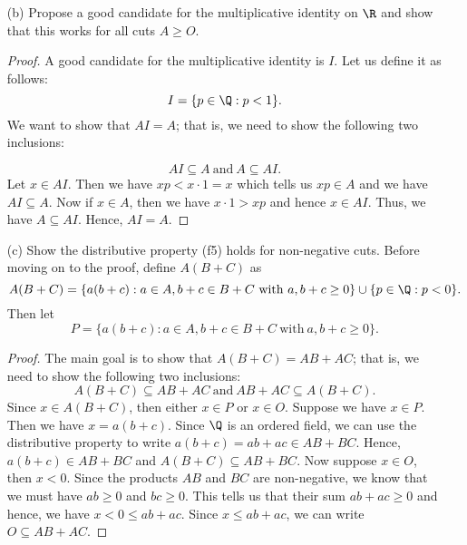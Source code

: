\begin{enumerate}
\begin{proof}
    Now we need to show that  property \( (o5)   \) holds for \( AB \). Assume \( A \geq O  \) and \( B \geq O  \). We know that \( O \subseteq A   \) and \(  O \subseteq B  \). This means that if we let \(  p, w \in O  \), then \( p, w \in A  \) and \( p, w  \in B  \). Note that \( p \cdot w < 0   \). Since \( ab \geq 0  \), we know that \( pw \leq ab  \) which implies that \( pw \in AB \) and hence, \( O \subseteq AB \).
        \end{proof}
    \item[(b)] Propose a good candidate for the multiplicative identity on \( \R  \) and show that this works for all cuts \( A \geq O  \).
        \begin{proof}
        A good candidate for the multiplicative identity is \( I  \). Let us define it as follows: 
        \[  I = \{ p \in \Q : p < 1 \}.  \] 
        We want to show that \( AI =A  \); that is, we need to show the following two inclusions:     

        \[  A I \subseteq A  \ \text{and} \ A \subseteq A  I. \]
        Let \( x \in A I  \). Then we have \( xp < x \cdot 1 = x   \) which tells us \( xp \in  A  \) and we have \( A I \subseteq A   \). Now if \( x \in A  \), then we have \( x \cdot 1 > xp  \) and hence \( x \in A  I \). Thus, we have \( A \subseteq AI  \). Hence, \(  AI = A  \). 
        \end{proof}

    \item[(c)] Show the distributive property (f5) holds for non-negative cuts.
        Before moving on to the proof, define \( A(B+C)  \) as 
        \[  A(B+C) = \{ a(b+c) : a \in A, b+c \in B+C \ \text{with} \ a, b+c \geq 0   \} \cup  \{ p \in \Q : p < 0  \}. \] Then let 
        \[  P = \{ a(b+c) : a \in A , b+c \in B + C \ \text{with} \ a, b+c \geq 0   \}.  \]
        \begin{proof}
        The main goal is to show that \( A (B+C) = AB + AC \); that is, we need to show the following two inclusions:
        \[  A (B+C) \subseteq AB+AC  \ \text{and} \  AB+AC \subseteq  A (B+C). \]
        Since \( x \in A(B+C)  \), then either \( x \in  P  \) or \( x \in O  \). Suppose we have \( x \in P  \). Then we have \( x = a(b+c)  \). Since \( \Q  \) is an ordered field, we can use the distributive property to write \( a(b+c) = ab+ ac \in AB + BC   \). Hence, \( a(b+c) \in AB + BC  \) and \( A(B+C) \subseteq AB + BC  \). Now suppose \( x \in O  \), then \( x < 0  \). Since the products \( AB  \) and \( BC  \) are non-negative, we know that we must have \( ab \geq 0  \) and \( bc \geq 0  \). This tells us that their sum \( ab + ac \geq 0  \) and hence, we have \( x <  0 \leq ab + ac   \). Since \( x \leq ab + ac  \), we can write \( O \subseteq AB + AC  \).  


\end{proof}
\end{enumerate}
